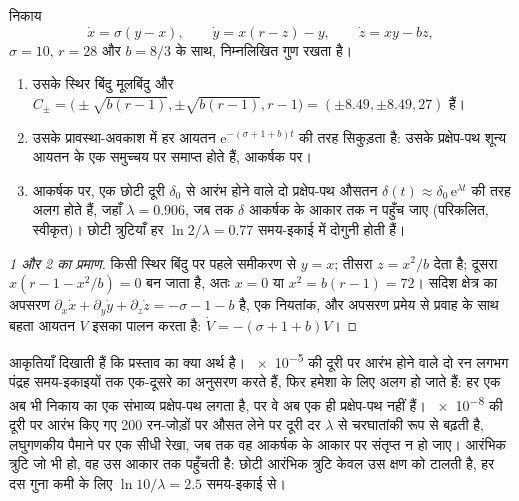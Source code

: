 \begin{proposition}[लॉरेंज़ निकाय]\label{prop:b2:weather-systems:lorenz}
निकाय
\[
  \dot x = \sigma(y - x), \qquad \dot y = x(r - z) - y, \qquad \dot z = xy - bz,
\]
$\sigma = 10$, $r = 28$ और $b = 8/3$ के साथ, निम्नलिखित गुण रखता है।
\begin{enumerate}
  \item उसके स्थिर बिंदु मूलबिंदु और $C_\pm = \bigl(\pm\sqrt{b(r - 1)}, \pm\sqrt{b(r - 1)},
        r - 1\bigr) = (\pm 8.49, \pm 8.49, 27)$ हैं।
  \item उसके प्रावस्था-अवकाश में हर आयतन $\mathrm{e}^{-(\sigma + 1 + b)t}$ की तरह सिकुड़ता है: उसके
        प्रक्षेप-पथ शून्य आयतन के एक समुच्चय पर समाप्त होते हैं, आकर्षक पर।
  \item आकर्षक पर, एक छोटी दूरी $\delta_0$ से आरंभ होने वाले दो प्रक्षेप-पथ
        औसतन $\delta(t) \approx \delta_0\,\mathrm{e}^{\lambda t}$ की तरह अलग होते हैं, जहाँ $\lambda =
        0.906$, जब तक $\delta$ आकर्षक के आकार तक न पहुँच जाए (परिकलित, स्वीकृत)। छोटी
        त्रुटियाँ हर $\ln 2/\lambda = 0.77$ समय-इकाई में दोगुनी होती हैं।
\end{enumerate}
\end{proposition}

\begin{proof}[1 और 2 का प्रमाण]
किसी स्थिर बिंदु पर पहले समीकरण से $y = x$; तीसरा $z = x^2/b$ देता है; दूसरा
$x(r - 1 - x^2/b) = 0$ बन जाता है, अतः $x = 0$ या $x^2 = b(r - 1) = 72$। सदिश क्षेत्र का
अपसरण $\partial_x\dot x + \partial_y\dot y + \partial_z\dot z = -\sigma - 1 - b$ है, एक
नियतांक, और अपसरण प्रमेय से प्रवाह के साथ बहता आयतन $V$ इसका पालन करता है: $\dot V =
-(\sigma + 1 + b)V$।
\end{proof}

आकृतियाँ दिखाती हैं कि प्रस्ताव का क्या अर्थ है। \num{e-5} की दूरी पर आरंभ होने वाले दो रन लगभग
पंद्रह समय-इकाइयों तक एक-दूसरे का अनुसरण करते हैं, फिर हमेशा के लिए अलग हो जाते हैं: हर एक अब भी निकाय का
एक संभाव्य प्रक्षेप-पथ लगता है, पर वे अब एक ही प्रक्षेप-पथ नहीं हैं। \num{e-8} की दूरी पर आरंभ किए गए
200 रन-जोड़ों पर औसत लेने पर दूरी दर $\lambda$ से चरघातांकी रूप से बढ़ती है, लघुगणकीय पैमाने पर एक सीधी
रेखा, जब तक वह आकर्षक के आकार पर संतृप्त न हो जाए। आरंभिक त्रुटि जो भी हो, वह उस आकार तक
पहुँचती है: छोटी आरंभिक त्रुटि केवल उस क्षण को टालती है, हर दस गुना कमी के लिए
$\ln 10/\lambda = 2.5$ समय-इकाई से।

